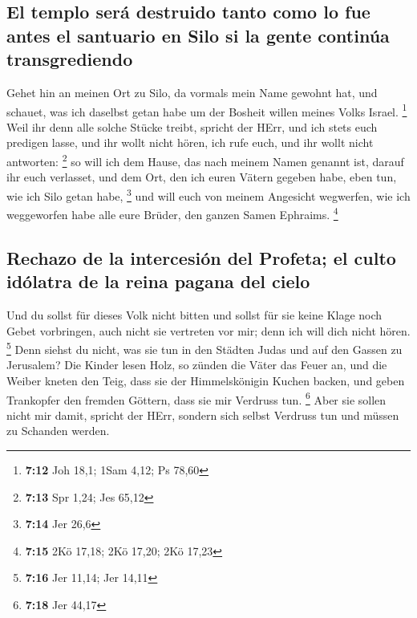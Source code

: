 \hypertarget{el-templo-seruxe1-destruido-tanto-como-lo-fue-antes-el-santuario-en-silo-si-la-gente-continuxfaa-transgrediendo}{%
\subsection{El templo será destruido tanto como lo fue antes el
santuario en Silo si la gente continúa
transgrediendo}\label{el-templo-seruxe1-destruido-tanto-como-lo-fue-antes-el-santuario-en-silo-si-la-gente-continuxfaa-transgrediendo}}

 Gehet hin an meinen Ort zu Silo, da vormals mein Name
gewohnt hat, und schauet, was ich daselbst getan habe um der Bosheit
willen meines Volks Israel. \footnote{\textbf{7:12} Joh 18,1; 1Sam 4,12;
  Ps 78,60}  Weil ihr denn alle solche Stücke treibt,
spricht der HErr, und ich stets euch predigen lasse, und ihr wollt nicht
hören, ich rufe euch, und ihr wollt nicht antworten: \footnote{\textbf{7:13}
  Spr 1,24; Jes 65,12}  so will ich dem Hause, das nach
meinem Namen genannt ist, darauf ihr euch verlasset, und dem Ort, den
ich euren Vätern gegeben habe, eben tun, wie ich Silo getan habe,
\footnote{\textbf{7:14} Jer 26,6}  und will euch von
meinem Angesicht wegwerfen, wie ich weggeworfen habe alle eure Brüder,
den ganzen Samen Ephraims. \footnote{\textbf{7:15} 2Kö 17,18; 2Kö 17,20;
  2Kö 17,23}

\hypertarget{rechazo-de-la-intercesiuxf3n-del-profeta-el-culto-iduxf3latra-de-la-reina-pagana-del-cielo}{%
\subsection{Rechazo de la intercesión del Profeta; el culto idólatra de
la reina pagana del
cielo}\label{rechazo-de-la-intercesiuxf3n-del-profeta-el-culto-iduxf3latra-de-la-reina-pagana-del-cielo}}

 Und du sollst für dieses Volk nicht bitten und sollst
für sie keine Klage noch Gebet vorbringen, auch nicht sie vertreten vor
mir; denn ich will dich nicht hören. \footnote{\textbf{7:16} Jer 11,14;
  Jer 14,11}  Denn siehst du nicht, was sie tun in den
Städten Judas und auf den Gassen zu Jerusalem?  Die
Kinder lesen Holz, so zünden die Väter das Feuer an, und die Weiber
kneten den Teig, dass sie der Himmelskönigin Kuchen backen, und geben
Trankopfer den fremden Göttern, dass sie mir Verdruss tun. \footnote{\textbf{7:18}
  Jer 44,17}  Aber sie sollen nicht mir damit, spricht
der HErr, sondern sich selbst Verdruss tun und müssen zu Schanden
werden.

